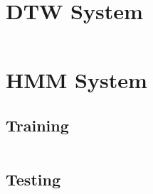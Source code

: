 \documentclass[12pt, a4paper, twoside]{report}
\begin{document}
\begin{appendices}
\section{DTW System}
\inputminted[linenos, numbersep=5pt, frame=single, breaklines=true, tabsize=2]
{Matlab}{codes/dtw.m}

\section{HMM System}
\subsection{Training}
\inputminted[linenos, numbersep=5pt, frame=single, breaklines=true, tabsize=2]
{Python}{codes/hmm-train.py}
\subsection{Testing}
\inputminted[linenos, numbersep=5pt, frame=single, breaklines=true, tabsize=2]
{Python}{codes/hmm-test.py}

\end{appendices}
\end{document}
